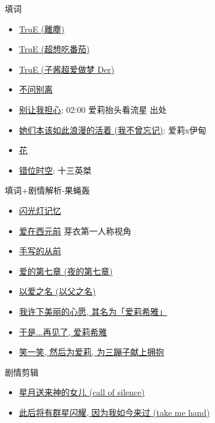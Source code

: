 \documentclass[a4paper]{article}
\begin{document}
填词

\begin{itemize}
    \item \href{https://www.bilibili.com/video/BV1gB4y1V7XK/}{TruE (離塵)}
    \item \href{https://www.bilibili.com/video/BV1SF411w73C/}{TruE (超想吃番茄)}
    \item \href{https://www.bilibili.com/video/BV1MB4y1V71h/}{TruE (子酱超爱做梦 Der)}
    \item \href{https://www.bilibili.com/video/BV19a4y1S7wF/}{不问别离}
    \item \href{https://www.bilibili.com/video/BV1vC4y177zp/}{别让我担心}: 02:00 爱莉抬头看流星 出处
    \item \href{https://www.bilibili.com/video/BV1pu411a7cv/}{她们本该如此浪漫的活着 (我不曾忘记)}: 爱莉x伊甸
    \item \href{https://www.bilibili.com/video/BV1DT41167gi/}{花}
    \item \href{https://www.bilibili.com/video/BV1Le4y1R73E/}{错位时空}: 十三英桀
\end{itemize}

填词+剧情解析-果蝇轰

\begin{itemize}
    \item \href{https://www.bilibili.com/video/BV1HppJeuEis/}{闪光灯记忆}
    \item \href{https://www.bilibili.com/video/BV1qN411g71m/}{爱在西元前} 芽衣第一人称视角
    \item \href{https://www.bilibili.com/video/BV1PV4y1x7CD/}{手写的从前}
    \item \href{https://www.bilibili.com/video/BV1dr4y177gy/}{爱的第七章 (夜的第七章)}
    \item \href{https://www.bilibili.com/video/BV1Yr4y1q7Pt/}{以爱之名 (以父之名)}
    \item \href{https://www.bilibili.com/video/BV1BF411w7fD/}{我许下美丽的心愿, 其名为「爱莉希雅」}
    \item \href{https://www.bilibili.com/video/BV1Cr4y1573W/}{于是...再见了, 爱莉希雅}
    \item \href{https://www.bilibili.com/video/BV1WN4y1L745/}{笑一笑, 然后为爱莉, 为三蹦子献上拥抱}
\end{itemize}

剧情剪辑

\begin{itemize}
    \item \href{https://www.bilibili.com/video/BV1ZT4y1s7Zd/}{星月送来神的女儿 (call of silence)}
    \item \href{https://www.bilibili.com/video/BV1Sm41167aK/}{此后将有群星闪耀, 因为我如今来过 (take me hand)}
\end{itemize}
\end{document}
